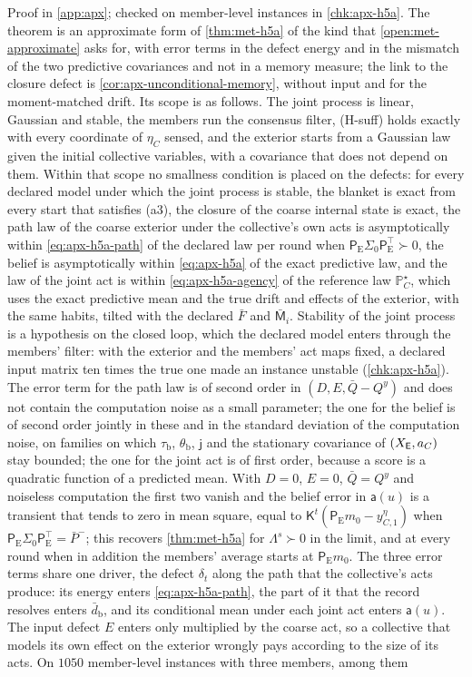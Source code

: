 Proof in \cref{app:apx}; checked on member-level instances in \cref{chk:apx-h5a}. The theorem is an approximate form of \cref{thm:met-h5a} of the kind that \cref{open:met-approximate} asks for, with error terms in the defect energy and in the mismatch of the two predictive covariances and not in a memory measure; the link to the closure defect is \cref{cor:apx-unconditional-memory}, without input and for the moment-matched drift. Its scope is as follows. The joint process is linear, Gaussian and stable, the members run the consensus filter, (H-suff) holds exactly with every coordinate of $\eta_C$ sensed, and the exterior starts from a Gaussian law given the initial collective variables, with a covariance that does not depend on them. Within that scope no smallness condition is placed on the defects: for every declared model under which the joint process is stable, the blanket is exact from every start that satisfies (a3), the closure of the coarse internal state is exact, the path law of the coarse exterior under the collective's own acts is asymptotically within \eqref{eq:apx-h5a-path} of the declared law per round when $\mathsf P_{\mathrm E}\Sigma_0\mathsf P_{\mathrm E}^\top\succ0$, the belief is asymptotically within \eqref{eq:apx-h5a} of the exact predictive law, and the law of the joint act is within \eqref{eq:apx-h5a-agency} of the reference law $\mathbb P^\star_C$, which uses the exact predictive mean and the true drift and effects of the exterior, with the same habits, tilted with the declared $\bar F$ and $\bar{\mathsf M}_i$. Stability of the joint process is a hypothesis on the closed loop, which the declared model enters through the members' filter: with the exterior and the members' act maps fixed, a declared input matrix ten times the true one made an instance unstable (\cref{chk:apx-h5a}). The error term for the path law is of second order in $(D,E,\bar Q-Q^y)$ and does not contain the computation noise as a small parameter; the one for the belief is of second order jointly in these and in the standard deviation of the computation noise, on families on which $\tau_{\mathrm b}$, $\theta_{\mathrm b}$, $\mathsf j$ and the stationary covariance of $(X_{\mathsf{E}},a_C)$ stay bounded; the one for the joint act is of first order, because a score is a quadratic function of a predicted mean. With $D=0$, $E=0$, $\bar Q=Q^y$ and noiseless computation the first two vanish and the belief error in $\mathsf a(u)$ is a transient that tends to zero in mean square, equal to $\mathsf K^t(\mathsf P_{\mathrm E}m_0-y^\eta_{C,1})$ when $\mathsf P_{\mathrm E}\Sigma_0\mathsf P_{\mathrm E}^\top=\bar P^-$; this recovers \cref{thm:met-h5a} for $\Lambda^s\succ0$ in the limit, and at every round when in addition the members' average starts at $\mathsf P_{\mathrm E}m_0$. The three error terms share one driver, the defect $\delta_t$ along the path that the collective's acts produce: its energy enters \eqref{eq:apx-h5a-path}, the part of it that the record resolves enters $\bar d_{\mathrm b}$, and its conditional mean under each joint act enters $\mathsf a(u)$. The input defect $E$ enters only multiplied by the coarse act, so a collective that models its own effect on the exterior wrongly pays according to the size of its acts. On $1050$ member-level instances with three members, among them 